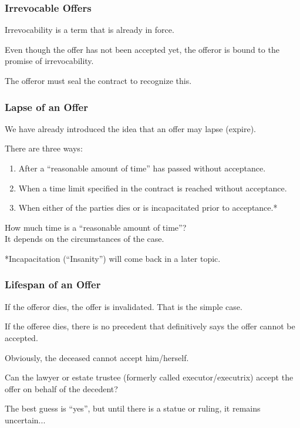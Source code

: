 \begin{frame}
\frametitle{Irrevocable Offers}

Irrevocability is a term that is already in force.

Even though the offer has not been accepted yet, the offeror is bound to the promise of irrevocability. 

The offeror must \alert{seal} the contract to recognize this.


\end{frame}

\begin{frame}
\frametitle{Lapse of an Offer}

We have already introduced the idea that an offer may lapse (expire).

There are three ways:

\begin{enumerate}
	\item After a ``reasonable amount of time'' has passed without acceptance.
	\item When a time limit specified in the contract is reached without acceptance.
	\item When either of the parties dies or is incapacitated prior to acceptance.*
\end{enumerate}

How much time is a ``reasonable amount of time''?\\
\quad It depends on the circumstances of the case. 

*Incapacitation (``Insanity'') will come back in a later topic.

\end{frame}



\begin{frame}
\frametitle{Lifespan of an Offer}

If the offeror dies, the offer is invalidated. That is the simple case.

If the offeree dies, there is no precedent that definitively says the offer cannot be accepted.

Obviously, the deceased cannot accept him/herself.

Can the lawyer or estate trustee (formerly called executor/executrix) accept the offer on behalf of the decedent?

The best guess is ``yes'', but until there is a statue or ruling, it remains uncertain...

\end{frame}







